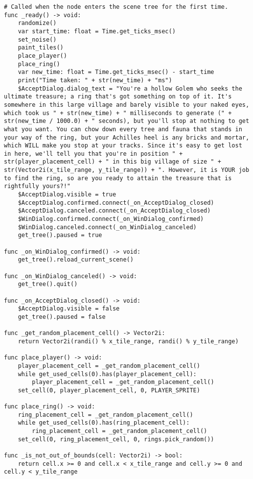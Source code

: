 \begin{lstlisting}
# Called when the node enters the scene tree for the first time.
func _ready() -> void:
	randomize()
	var start_time: float = Time.get_ticks_msec()
	set_noise()
	paint_tiles()
	place_player()
	place_ring()
	var new_time: float = Time.get_ticks_msec() - start_time
	print("Time taken: " + str(new_time) + "ms")
	$AcceptDialog.dialog_text = "You're a hollow Golem who seeks the ultimate treasure; a ring that's got something on top of it. It's somewhere in this large village and barely visible to your naked eyes, which took us " + str(new_time) + " milliseconds to generate (" + str(new_time / 1000.0) + " seconds), but you'll stop at nothing to get what you want. You can chow down every tree and fauna that stands in your way of the ring, but your Achilles heel is any bricks and mortar, which WILL make you stop at your tracks. Since it's easy to get lost in here, we'll tell you that you're in position " + str(player_placement_cell) + " in this big village of size " + str(Vector2i(x_tile_range, y_tile_range)) + ". However, it is YOUR job to find the ring, so are you ready to attain the treasure that is rightfully yours?!"
	$AcceptDialog.visible = true
	$AcceptDialog.confirmed.connect(_on_AcceptDialog_closed)
	$AcceptDialog.canceled.connect(_on_AcceptDialog_closed)
	$WinDialog.confirmed.connect(_on_WinDialog_confirmed)
	$WinDialog.canceled.connect(_on_WinDialog_canceled)
	get_tree().paused = true

func _on_WinDialog_confirmed() -> void:
	get_tree().reload_current_scene()

func _on_WinDialog_canceled() -> void:
	get_tree().quit()

func _on_AcceptDialog_closed() -> void:
	$AcceptDialog.visible = false
	get_tree().paused = false

func _get_random_placement_cell() -> Vector2i:
	return Vector2i(randi() % x_tile_range, randi() % y_tile_range)

func place_player() -> void:
	player_placement_cell = _get_random_placement_cell()
	while get_used_cells(0).has(player_placement_cell):
		player_placement_cell = _get_random_placement_cell()
	set_cell(0, player_placement_cell, 0, PLAYER_SPRITE)

func place_ring() -> void:
	ring_placement_cell = _get_random_placement_cell()
	while get_used_cells(0).has(ring_placement_cell):
		ring_placement_cell = _get_random_placement_cell()
	set_cell(0, ring_placement_cell, 0, rings.pick_random())

func _is_not_out_of_bounds(cell: Vector2i) -> bool:
	return cell.x >= 0 and cell.x < x_tile_range and cell.y >= 0 and cell.y < y_tile_range


\end{lstlisting}
